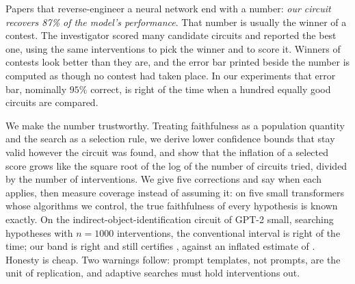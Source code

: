 Papers that reverse-engineer a neural network end with a number: \emph{our
circuit recovers 87\% of the model's performance}. That number is usually the
winner of a contest. The investigator scored many candidate circuits and reported
the best one, using the same interventions to pick the winner and to score it.
Winners of contests look better than they are, and the error bar printed beside
the number is computed as though no contest had taken place. In our experiments
that error bar, nominally $95\%$ correct, is right \MyNaiveCovHundred{} of the
time when a hundred equally good circuits are compared.

We make the number trustworthy. Treating faithfulness as a population quantity
and the search as a selection rule, we derive lower confidence bounds that stay
valid however the circuit was found, and show that the inflation of a selected
score grows like the square root of the log of the number of circuits tried,
divided by the number of interventions. We give five corrections and say when
each applies, then measure coverage instead of assuming it: on five small
transformers whose algorithms we control, the true faithfulness of every
hypothesis is known exactly. On the
indirect-object-identification circuit of GPT-2 small, searching \MyIOIm{}
hypotheses with $n=1000$ interventions, the conventional interval is right
\MyIOINaiveCov{} of the time; our band is right \MyIOIBootCov{} and still
certifies \MyIOIBootLCB{}, against an inflated estimate of \MyIOINaivePoint{}.
Honesty is cheap. Two warnings follow: prompt templates, not prompts, are the
unit of replication, and adaptive searches must hold interventions out.
